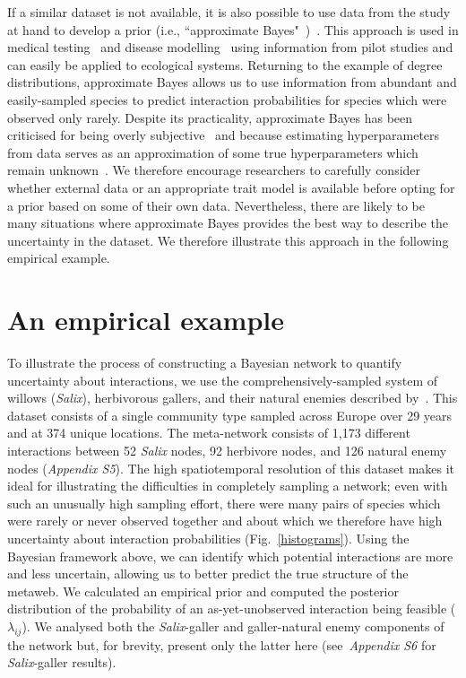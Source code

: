 \documentclass[12pt]{article}
\begin{document}
\begin{spacing}{2.0}
        If a similar dataset is not available, it is also possible to use data from the study at hand to develop a prior (i.e., ``approximate Bayes"~\citet{Gelmanblog})~\citep{Spiegelhalter2000}. This approach is used in medical testing~\citep{Spiegelhalter2000} and disease modelling~\citep{Leyland2005} using information from pilot studies and can easily be applied to ecological systems. Returning to the example of degree distributions, approximate Bayes allows us to use information from abundant and easily-sampled species to predict interaction probabilities for species which were observed only rarely. Despite its practicality, approximate Bayes has been criticised for being overly subjective~\citep{Berger2006} and because estimating hyperparameters from data serves as an approximation of some true hyperparameters which remain unknown~\citep{Gelmanblog}. We therefore encourage researchers to carefully consider whether external data or an appropriate trait model is available before opting for a prior based on some of their own data. Nevertheless, there are likely to be many situations where approximate Bayes provides the best way to describe the uncertainty in the dataset. We therefore illustrate this approach in the following empirical example.


  \section*{An empirical example}

      To illustrate the process of constructing a Bayesian network to quantify uncertainty about interactions, we use the comprehensively-sampled system of willows (\emph{Salix}), herbivorous gallers, and their natural enemies described by~\citet{Kopelke2017}. This dataset consists of a single community type sampled across Europe over 29 years and at 374 unique locations. The meta-network consists of 1,173 different interactions between 52 \emph{Salix} nodes, 92 herbivore nodes, and 126 natural enemy nodes (\emph{Appendix S5}). 
      The high spatiotemporal resolution of this dataset makes it ideal for illustrating the difficulties in completely sampling a network; even with such an unusually high sampling effort, there were many pairs of species which were rarely or never observed together and about which we therefore have high uncertainty about interaction probabilities (Fig.~\ref{histograms}). Using the Bayesian framework above, we can identify which potential interactions are more and less uncertain, allowing us to better predict the true structure of the metaweb. 
      We calculated an empirical prior and computed the posterior distribution of the probability of an as-yet-unobserved interaction being feasible ($\lambda_{ij}$). We analysed both the \emph{Salix}-galler and galler-natural enemy components of the network but, for brevity, present only the latter here (see~\emph{Appendix S6} for \emph{Salix}-galler results).



\end{spacing}
\end{document}
